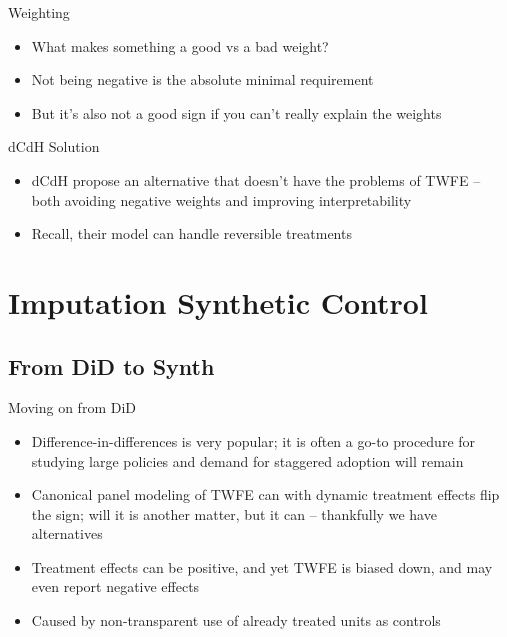\documentclass{beamer}
\begin{document}
\begin{frame}{Weighting}

\begin{itemize}
\item What makes something a good vs a bad weight?
\item Not being negative is the absolute minimal requirement
\item But it's also not a good sign if you can't really explain the weights
\end{itemize}

\end{frame}

\begin{frame}{dCdH Solution}

\begin{itemize}
\item dCdH propose an alternative that doesn't have the problems of TWFE -- both avoiding negative weights and improving interpretability
\item Recall, their model can handle reversible treatments

\end{itemize}

\end{frame}





\section{Imputation Synthetic Control}

\subsection{From DiD to Synth}

\begin{frame}{Moving on from DiD}

\begin{itemize}

\item Difference-in-differences is very popular; it is often a go-to procedure for studying large policies and demand for staggered adoption will remain
\item Canonical panel modeling of TWFE can with dynamic treatment effects flip the sign; will it is another matter, but it can -- thankfully we have alternatives
\item Treatment effects can be positive, and yet TWFE is biased down, and may even report negative effects
\item Caused by non-transparent use of already treated units as controls

\end{itemize}

\end{frame}
\end{document}
